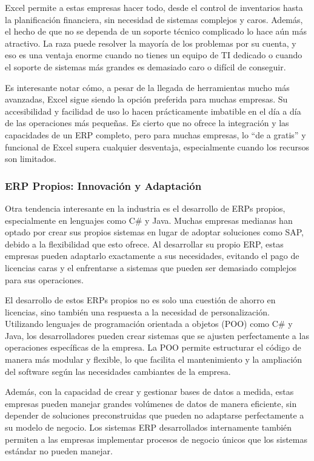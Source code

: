 \documentclass[
  10pt,
  letterpaper,
]{book}
\begin{document}
Excel permite a estas empresas hacer todo, desde el control de
inventarios hasta la planificación financiera, sin necesidad de sistemas
complejos y caros. Además, el hecho de que no se dependa de un soporte
técnico complicado lo hace aún más atractivo. La raza puede resolver la
mayoría de los problemas por su cuenta, y eso es una ventaja enorme
cuando no tienes un equipo de TI dedicado o cuando el soporte de
sistemas más grandes es demasiado caro o difícil de conseguir.

Es interesante notar cómo, a pesar de la llegada de herramientas mucho
más avanzadas, Excel sigue siendo la opción preferida para muchas
empresas. Su accesibilidad y facilidad de uso lo hacen prácticamente
imbatible en el día a día de las operaciones más pequeñas. Es cierto que
no ofrece la integración y las capacidades de un ERP completo, pero para
muchas empresas, lo ``de a gratis'' y funcional de Excel supera
cualquier desventaja, especialmente cuando los recursos son limitados.

\subsubsection{ERP Propios: Innovación y
Adaptación}\label{erp-propios-innovaciuxf3n-y-adaptaciuxf3n}

Otra tendencia interesante en la industria es el desarrollo de ERPs
propios, especialmente en lenguajes como C\# y Java. Muchas empresas
medianas han optado por crear sus propios sistemas en lugar de adoptar
soluciones como SAP, debido a la flexibilidad que esto ofrece. Al
desarrollar su propio ERP, estas empresas pueden adaptarlo exactamente a
sus necesidades, evitando el pago de licencias caras y el enfrentarse a
sistemas que pueden ser demasiado complejos para sus operaciones.

El desarrollo de estos ERPs propios no es solo una cuestión de ahorro en
licencias, sino también una respuesta a la necesidad de personalización.
Utilizando lenguajes de programación orientada a objetos (POO) como C\#
y Java, los desarrolladores pueden crear sistemas que se ajusten
perfectamente a las operaciones específicas de la empresa. La POO
permite estructurar el código de manera más modular y flexible, lo que
facilita el mantenimiento y la ampliación del software según las
necesidades cambiantes de la empresa.

Además, con la capacidad de crear y gestionar bases de datos a medida,
estas empresas pueden manejar grandes volúmenes de datos de manera
eficiente, sin depender de soluciones preconstruidas que pueden no
adaptarse perfectamente a su modelo de negocio. Los sistemas ERP
desarrollados internamente también permiten a las empresas implementar
procesos de negocio únicos que los sistemas estándar no pueden manejar.
\end{document}
